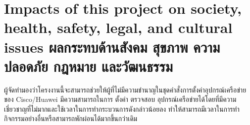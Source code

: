 \section{\ifenglish%
Impacts of this project on society, health, safety, legal, and cultural issues
\else%
ผลกระทบด้านสังคม สุขภาพ ความปลอดภัย กฎหมาย และวัฒนธรรม
\fi}

\hspace{0.5in}
ผู้จัดทำมองว่าโครงงานนี้จะสามารถช่วยให้ผู้ที่ไม่มีความชำนาญในชุดคำสั่งการตั้งค่าอุปกรณ์เครือข่ายของ Cisco/Huawei มีความสามารถในการ ตั้งค่า ตรวจสอบ อุปกรณ์เครือข่ายได้โดยที่มีความเชี่ยวชาญที่ไม่มากและใช้เวลาในการทำกระบวนการดังกล่าวน้อยลง ทำให้สามารถมีเวลาในการทำกิจกรรมอย่างอื่นหรือสามารถพักผ่อนได้มากขึ้นกว่าเดิม
